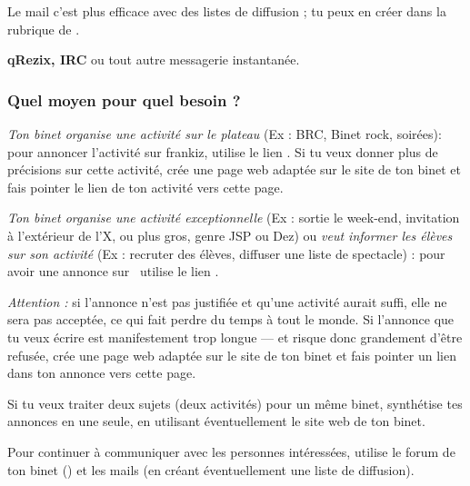   Le mail c'est plus efficace avec des listes de diffusion ; tu peux en créer dans la rubrique  de .

\textbf{qRezix, IRC} ou tout autre messagerie instantanée.

\subsubsection{Quel moyen pour quel besoin ?}
\emph{Ton binet organise une activité sur le plateau} (Ex : BRC,
Binet rock, soirées): pour annoncer l'activité sur frankiz, utilise
le lien . Si tu veux donner plus de
précisions sur cette activité, crée une page web adaptée sur le site
de ton binet et fais pointer le lien de ton activité vers cette
page.

\emph{Ton binet organise une activité exceptionnelle} (Ex : sortie le week-end, invitation à l'extérieur de l'X, ou plus gros, genre JSP ou Dez) ou
\emph{veut informer les élèves sur son activité} (Ex : recruter des élèves, diffuser une liste de spectacle) : pour avoir une annonce sur \fkz\,
utilise le lien .

\emph{Attention :} si l'annonce n'est pas justifiée et qu'une activité aurait suffi, elle ne sera pas acceptée, ce qui fait perdre du temps à tout le
monde. Si l'annonce que tu veux écrire est manifestement trop longue --- et risque donc grandement d'être refusée, crée une page web adaptée sur le
site de ton binet et fais pointer un lien dans ton annonce vers cette page.

Si tu veux traiter deux sujets (deux activités) pour un même binet,
synthétise tes annonces en une seule, en utilisant éventuellement le
site web de ton binet.

Pour continuer à communiquer avec les personnes intéressées, utilise
le forum de ton binet () et les mails
(en créant éventuellement une liste de diffusion).
